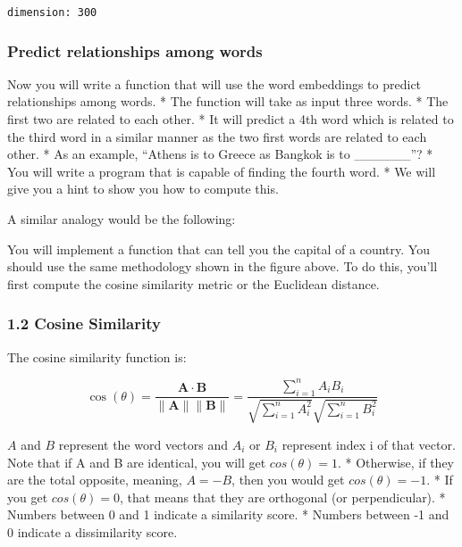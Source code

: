 \documentclass[11pt]{article}
\begin{document}
    \begin{Verbatim}[commandchars=\\\{\}]
dimension: 300
    \end{Verbatim}

    \hypertarget{predict-relationships-among-words}{%
\subsubsection{Predict relationships among
words}\label{predict-relationships-among-words}}

Now you will write a function that will use the word embeddings to
predict relationships among words. * The function will take as input
three words. * The first two are related to each other. * It will
predict a 4th word which is related to the third word in a similar
manner as the two first words are related to each other. * As an
example, ``Athens is to Greece as Bangkok is to \_\_\_\_\_\_''? * You
will write a program that is capable of finding the fourth word. * We
will give you a hint to show you how to compute this.

A similar analogy would be the following:

You will implement a function that can tell you the capital of a
country. You should use the same methodology shown in the figure above.
To do this, you'll first compute the cosine similarity metric or the
Euclidean distance.

    \hypertarget{cosine-similarity}{%
\subsubsection{1.2 Cosine Similarity}\label{cosine-similarity}}

The cosine similarity function is:

\[\cos (\theta)=\frac{\mathbf{A} \cdot \mathbf{B}}{\|\mathbf{A}\|\|\mathbf{B}\|}=\frac{\sum_{i=1}^{n} A_{i} B_{i}}{\sqrt{\sum_{i=1}^{n} A_{i}^{2}} \sqrt{\sum_{i=1}^{n} B_{i}^{2}}}\tag{1}\]

\(A\) and \(B\) represent the word vectors and \(A_i\) or \(B_i\)
represent index i of that vector. Note that if A and B are identical,
you will get \(cos(\theta) = 1\). * Otherwise, if they are the total
opposite, meaning, \(A= -B\), then you would get \(cos(\theta) = -1\). *
If you get \(cos(\theta) =0\), that means that they are orthogonal (or
perpendicular). * Numbers between 0 and 1 indicate a similarity score. *
Numbers between -1 and 0 indicate a dissimilarity score.
\end{document}
